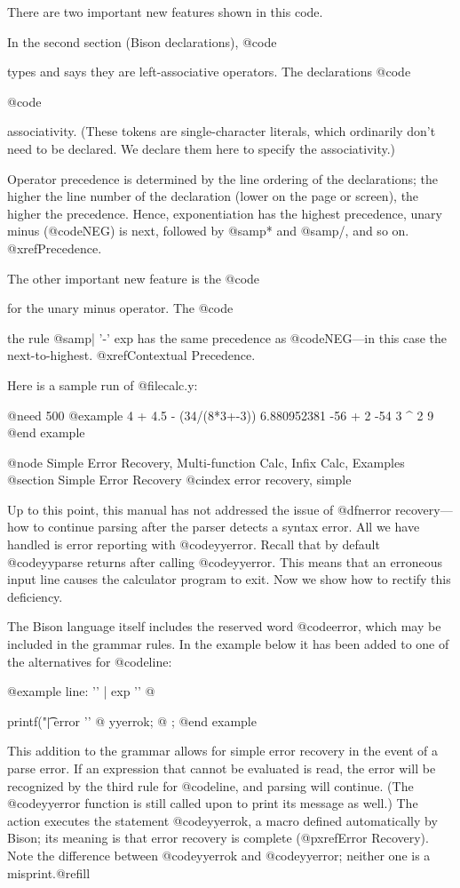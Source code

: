 {{{{There are two important new features shown in this code.

In the second section (Bison declarations), @code{%
types and says they are left-associative operators.  The declarations
@code{%
@code{%
associativity.  (These tokens are single-character literals, which
ordinarily don't need to be declared.  We declare them here to specify
the associativity.)

Operator precedence is determined by the line ordering of the
declarations; the higher the line number of the declaration (lower on
the page or screen), the higher the precedence.  Hence, exponentiation
has the highest precedence, unary minus (@code{NEG}) is next, followed
by @samp{*} and @samp{/}, and so on.  @xref{Precedence}.

The other important new feature is the @code{%
for the unary minus operator.  The @code{%
the rule @samp{| '-' exp} has the same precedence as @code{NEG}---in this
case the next-to-highest.  @xref{Contextual Precedence}.

Here is a sample run of @file{calc.y}:

@need 500
@example
4 + 4.5 - (34/(8*3+-3))
6.880952381
-56 + 2
-54
3 ^ 2
9
@end example

@node Simple Error Recovery, Multi-function Calc, Infix Calc, Examples
@section Simple Error Recovery
@cindex error recovery, simple

Up to this point, this manual has not addressed the issue of @dfn{error
recovery}---how to continue parsing after the parser detects a syntax
error.  All we have handled is error reporting with @code{yyerror}.  Recall
that by default @code{yyparse} returns after calling @code{yyerror}.  This
means that an erroneous input line causes the calculator program to exit.
Now we show how to rectify this deficiency.

The Bison language itself includes the reserved word @code{error}, which
may be included in the grammar rules.  In the example below it has
been added to one of the alternatives for @code{line}:

@example
line:     '\n'
        | exp '\n'   @{ printf("\t%
        | error '\n' @{ yyerrok;                 @}
;
@end example

This addition to the grammar allows for simple error recovery in the event
of a parse error.  If an expression that cannot be evaluated is read, the
error will be recognized by the third rule for @code{line}, and parsing
will continue.  (The @code{yyerror} function is still called upon to print
its message as well.)  The action executes the statement @code{yyerrok}, a
macro defined automatically by Bison; its meaning is that error recovery is
complete (@pxref{Error Recovery}).  Note the difference between
@code{yyerrok} and @code{yyerror}; neither one is a misprint.@refill

}}}}}}}}}}
